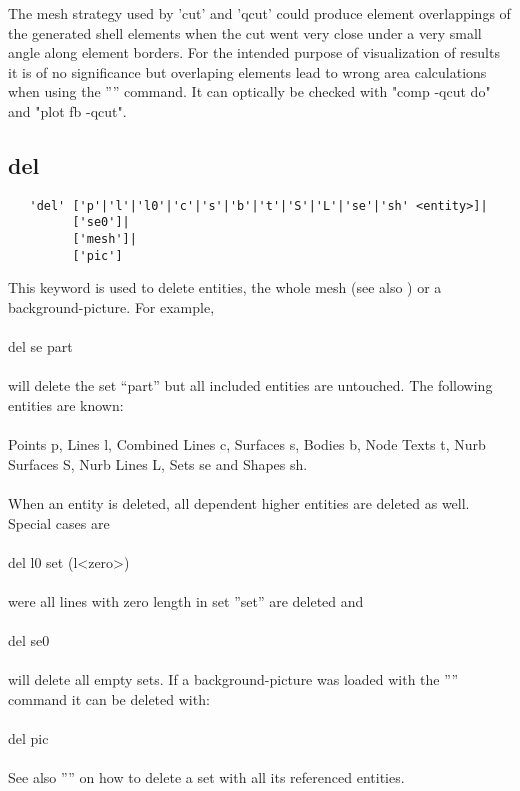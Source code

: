\documentclass{article}
\begin{document}
The mesh strategy used by 'cut' and 'qcut' could produce element overlappings of the generated shell elements when the cut went very close under a very small angle along element borders. For the intended purpose of visualization of results it is of no significance but overlaping elements lead to wrong area calculations when using the '''' command. It can optically be checked with "comp -qcut do" and "plot fb -qcut".


\subsection{\label{del}del}
\begin{verbatim}
   'del' ['p'|'l'|'l0'|'c'|'s'|'b'|'t'|'S'|'L'|'se'|'sh' <entity>]|
         ['se0']|
         ['mesh']|
         ['pic'] 
\end{verbatim}
This keyword is used to delete entities, the whole mesh (see also ) or a background-picture. For example,\\\\
del se part\\\\
will delete the set ``part'' but all included entities are untouched. The following entities are known:\\\\
Points p, Lines l, Combined Lines c, Surfaces s, Bodies b, Node Texts t, Nurb Surfaces S, Nurb Lines L, Sets se and Shapes sh.\\\\
When an entity is deleted, all dependent higher entities are deleted as well. Special cases are\\\\del l0 set  (l<zero>)\\\\were all lines with zero length in set ''set'' are deleted and\\\\del se0\\\\will delete all empty sets.
If a background-picture was loaded with the '''' command it can be deleted with:\\\\
del pic
\\\\See also '''' on how to delete a set with all its referenced entities.
\end{document}
